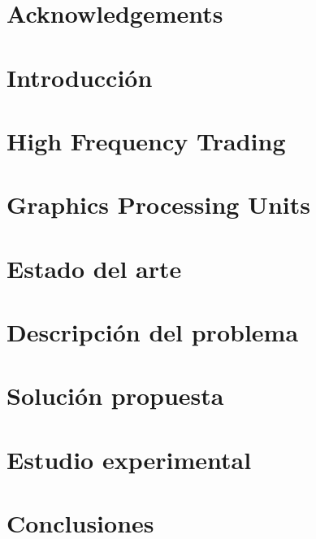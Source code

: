 \documentclass[spanish,12pt,letterpaper,oneside]{book}
\begin{document}
    

    \begin{spacing}{.97}
        \newpage
        

        \newpage
        \chapter*{Acknowledgements}
        \label{ch:acknowledgements}
        

        \newpage
        
        

        \chapter{Introducción}
        \label{ch:introduction}
        

        \chapter{High Frequency Trading}
        \label{ch:hft}
        

        \chapter{Graphics Processing Units}
        \label{ch:gpu}
        

        \chapter{Estado del arte}
        \label{ch:sota}
        

        \chapter{Descripción del problema}
        \label{ch:problema}
        

        \chapter{Solución propuesta}
        \label{ch:solucion}
        

        \chapter{Estudio experimental}
        \label{ch:experimentos}
        

        \chapter{Conclusiones}
        \label{ch:conclusiones}
        

        
        
        \nocite{*}
    \end{spacing}
\end{document}
